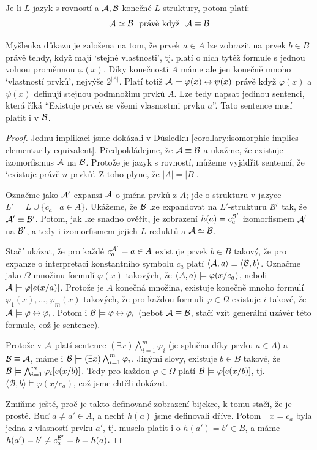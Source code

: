 \begin{proposition}
    Je-li $L$ jazyk s rovností a $\mathcal{A},\mathcal{B}$ konečné $L$-struktury, potom platí:
    $$
    \mathcal{A}\simeq\mathcal{B}\ \text{ právě když }\ \mathcal{A}\equiv\mathcal{B}
    $$
\end{proposition}
Myšlenka důkazu je založena na tom, že prvek $a\in A$ lze zobrazit na prvek $b\in B$ právě tehdy, když mají `stejné vlastnosti', tj. platí o nich tytéž formule s jednou volnou proměnnou $\varphi(x)$. Díky konečnosti $A$ máme ale jen konečně mnoho `vlastností prvků', nejvýše $2^{|A|}$. Platí totiž $\mathcal{A}\models\varphi(x)\mathbin{\leftrightarrow}\psi(x)$ právě když $\varphi(x)$ a $\psi(x)$ definují stejnou podmnožinu prvků $A$. Lze tedy napsat jedinou sentenci, která říká ``Existuje prvek se všemi vlasnostmi prvku $a$''. Tato sentence musí platit i v $\mathcal{B}$.
\begin{proof}
    Jednu implikaci jsme dokázali v Důsledku \ref{corollary:isomorphic-implies-elementarily-equivalent}. Předpokládejme, že $\mathcal{A}\equiv\mathcal{B}$ a ukažme, že existuje izomorfismus $\mathcal{A}$ na $\mathcal{B}$. Protože je jazyk s rovností, můžeme vyjádřit sentencí, že `existuje právě $n$ prvků'. Z toho plyne, že $|A|=|B|$.

    Označme jako $\mathcal{A}'$ expanzi $\mathcal{A}$ o jména prvků z $A$; jde o strukturu v jazyce $L'=L\cup\{c_a\mid a\in A\}$. Ukážeme, že $\mathcal{B}$ lze expandovat na $L'$-strukturu $\mathcal{B}'$ tak, že $\mathcal{A}'\equiv \mathcal{B}'$. Potom, jak lze snadno ověřit, je zobrazení $h(a)= c_a^{\mathcal{B}'}$ izomorfismem $\mathcal{A}'$ na $\mathcal{B}'$, a tedy i izomorfismem jejich $L$-reduktů a $\mathcal{A}\simeq\mathcal{B}$.

    Stačí ukázat, že pro každé $c_a^{\mathcal{A}'}=a\in A$ existuje prvek $b\in B$ takový, že pro expanze o interpretaci konstantního symbolu $c_a$ platí $\langle  \mathcal{A},a\rangle\equiv\langle\mathcal{B},b\rangle$. Označme jako $\Omega$ množinu formulí $\varphi(x)$ takových, že $\langle \mathcal{A},a\rangle \models \varphi(x/c_a)$, neboli $\mathcal{A}\models \varphi[e(x/a)]$. Protože je $A$ konečná množina, existuje konečně mnoho formulí $\varphi_1(x),\dots,\varphi_m(x)$ takových, že pro každou formuli $\varphi \in \Omega$ existuje $i$ takové, že $\mathcal{A}\models \varphi\mathbin{\leftrightarrow}\varphi_i$. Potom i $\mathcal{B}\models\varphi\mathbin{\leftrightarrow}\varphi_i$ (neboť $\mathcal{A}\equiv\mathcal{B}$, stačí vzít generální uzávěr této formule, což je sentence).
    
    Protože v $\mathcal{A}$ platí sentence $(\exists x)\bigwedge_{i=1}^m\varphi_i$ (je splněna díky prvku $a\in A$) a $\mathcal{B}\equiv\mathcal{A}$, máme i $\mathcal{B}\models (\exists x)\bigwedge_{i=1}^m\varphi_i$. Jinými slovy, existuje $b\in B$ takové, že $\mathcal{B}\models\bigwedge_{i=1}^m\varphi_i[e(x/b)]$. Tedy pro každou $\varphi\in \Omega$ platí $\mathcal{B}\models \varphi[e(x/b)]$, tj. $\langle\mathcal{B},b\rangle\models \varphi(x/c_a)$, což jsme chtěli dokázat.

    Zmiňme ještě, proč je takto definované zobrazení bijekce, k tomu stačí, že je prosté. Buď $a\neq a'\in A$, a nechť $h(a)$ jsme definovali dříve. Potom $\neg x=c_a$ byla jedna z vlasností prvku $a'$, tj. musela platit i o $h(a')=b'\in B$, a máme $h(a')=b'\neq c_a^{\mathcal{B}'}=b=h(a)$.
\end{proof}

